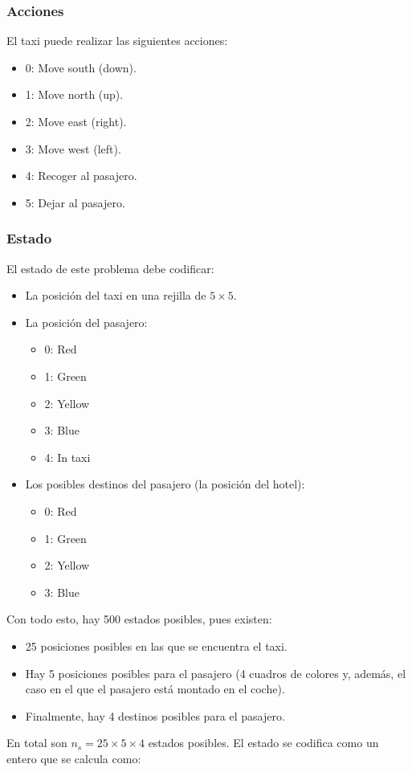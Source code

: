 \documentclass{article}
\begin{document}
\subsubsection{Acciones}
El taxi puede realizar las siguientes acciones:
\begin{itemize}
    \item 0: Move south (down).
    \item 1: Move north (up).
    \item 2: Move east (right).
    \item 3: Move west (left).
    \item 4: Recoger al pasajero.
    \item 5: Dejar al pasajero.
\end{itemize}

\subsubsection{Estado}
El estado de este problema debe codificar:
\begin{itemize}
    \item La posición del taxi en una rejilla de $5\times 5$.
    \item La posición del pasajero: 
    \begin{itemize}
        \item 0: Red
        \item 1: Green
        \item 2: Yellow
        \item 3: Blue
        \item 4: In taxi
    \end{itemize}
    \item Los posibles destinos del pasajero (la posición del hotel): 
    \begin{itemize}
        \item 0: Red
        \item 1: Green
        \item 2: Yellow
        \item 3: Blue
    \end{itemize}
\end{itemize}

Con todo esto, hay 500 estados posibles, pues existen:
\begin{itemize}
    \item 25 posiciones posibles en las que se encuentra el taxi.
    \item Hay 5 posiciones posibles para el pasajero (4 cuadros de colores y, además, el caso en el que el pasajero está montado en el coche).
    \item Finalmente, hay 4 destinos posibles para el pasajero.
\end{itemize}
En total son $n_s=25\times5\times4$ estados posibles. El estado se codifica como un entero que se calcula como: 
\end{document}
